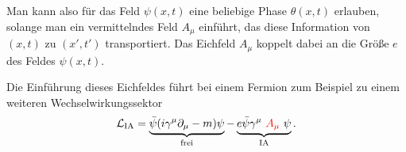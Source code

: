 Man kann also für das Feld $\psi(x,t)$ eine beliebige Phase $\theta(x,t)$ erlauben, solange man ein vermittelndes Feld $A_\mu$ einführt, das diese Information von $(x,t)$ zu $(x',t')$ transportiert.
Das Eichfeld $A_\mu$ koppelt dabei an die Größe $e$ des Feldes $\psi(x,t)$.

Die Einführung dieses Eichfeldes führt bei einem Fermion zum Beispiel zu einem weiteren Wechselwirkungssektor
\begin{equation*}
	\mathcal{L}_\text{IA} = \underbrace{\bar{\psi}(i\gamma^\mu\partial_\mu - m)\psi}_\text{frei} - \underbrace{e\bar{\psi}\gamma^\mu\ \textcolor{red}{A_\mu}\ \psi}_\text{IA}.
\end{equation*}
